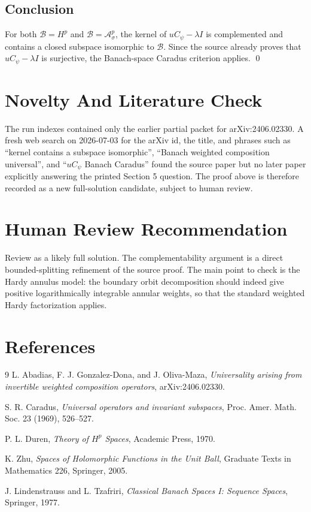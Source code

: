 \documentclass[11pt]{article}
\newcommand{\B}{\mathcal B}
\newcommand{\A}{\mathcal A}
\begin{document}
\subsection*{Conclusion}

For both \(\B=H^p\) and \(\B=\A_\sigma^p\), the kernel of
\(uC_\psi-\lambda I\) is complemented and contains a closed subspace
isomorphic to \(\B\).  Since the source already proves that
\(uC_\psi-\lambda I\) is surjective, the Banach-space Caradus criterion
applies.
\qed

\section*{Novelty And Literature Check}

The run indexes contained only the earlier partial packet for arXiv:2406.02330.
A fresh web search on 2026-07-03 for the arXiv id, the title, and phrases such
as ``kernel contains a subspace isomorphic'', ``Banach weighted composition
universal'', and ``\(uC_\psi\) Banach Caradus'' found the source paper but no
later paper explicitly answering the printed Section 5 question.  The proof
above is therefore recorded as a new full-solution candidate, subject to human
review.

\section*{Human Review Recommendation}

Review as a likely full solution.  The complementability argument is a direct
bounded-splitting refinement of the source proof.  The main point to check is
the Hardy annulus model: the boundary orbit decomposition should indeed give
positive logarithmically integrable annular weights, so that the standard
weighted Hardy factorization applies.

\section*{References}

\begin{thebibliography}{9}
L. Abadias, F. J. Gonzalez-Dona, and J. Oliva-Maza,
\emph{Universality arising from invertible weighted composition operators},
arXiv:2406.02330.

S. R. Caradus,
\emph{Universal operators and invariant subspaces},
Proc. Amer. Math. Soc. 23 (1969), 526--527.

P. L. Duren,
\emph{Theory of \(H^p\) Spaces},
Academic Press, 1970.

K. Zhu,
\emph{Spaces of Holomorphic Functions in the Unit Ball},
Graduate Texts in Mathematics 226, Springer, 2005.

J. Lindenstrauss and L. Tzafriri,
\emph{Classical Banach Spaces I: Sequence Spaces},
Springer, 1977.
\end{thebibliography}
\end{document}
